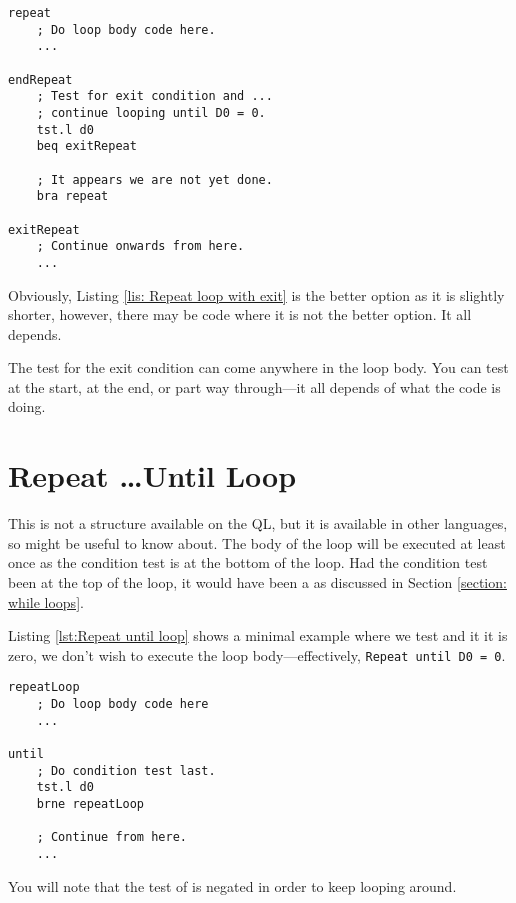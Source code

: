 \begin{lstlisting}[caption={Alternative REPEAT \ldots EXIT \ldots END REPEAT},label={lis: Repeat loop with alternative exit}]
repeat
    ; Do loop body code here.
    ...

endRepeat
    ; Test for exit condition and ...
    ; continue looping until D0 = 0.
    tst.l d0
    beq exitRepeat

    ; It appears we are not yet done.
    bra repeat

exitRepeat
    ; Continue onwards from here.
    ...
\end{lstlisting}

Obviously, Listing \ref{lis: Repeat loop with exit} is the better option as it is slightly shorter, however, there may be code where it is not the better option. It all depends.

The test for the exit condition can come anywhere in the loop body. You can test at the start, at the end, or part way through---it all depends of what the code is doing.

\section{Repeat \ldots\protect Until Loop}\label{section: repeat until loops}

This is not a structure available on the QL, but it is available in other languages, so might be useful to know about. The body of the loop will be executed at least once as the condition test is at the bottom of the loop. Had the condition test been at the top of the loop, it would have been a  as discussed in Section \ref{section: while loops}.

Listing \ref{lst:Repeat until loop} shows a minimal example where we test  and it it is zero, we don't wish to execute the loop body---effectively, \texttt{Repeat until D0 = 0}.

\begin{lstlisting}[caption={REPEAT UNTIL \ldots},label={lst:Repeat until loop}]
repeatLoop
    ; Do loop body code here
    ...
    
until
    ; Do condition test last.
    tst.l d0
    brne repeatLoop
    
    ; Continue from here.
    ...
\end{lstlisting}

You will note that the test of  is negated in order to keep looping around. 

